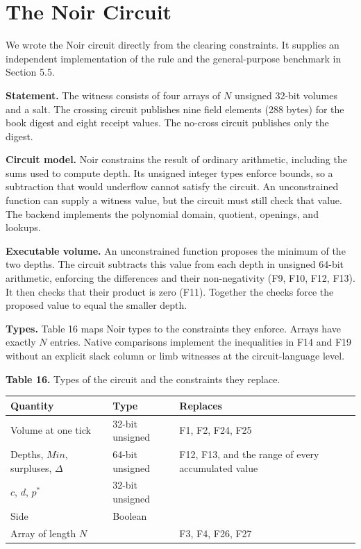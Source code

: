 
\section{The Noir Circuit}

We wrote the Noir circuit directly from the clearing constraints. It supplies an independent implementation of the rule and the general-purpose benchmark in Section 5.5.

\textbf{Statement.} The witness consists of four arrays of \(N\) unsigned 32-bit volumes and a salt. The crossing circuit publishes nine field elements (288 bytes) for the book digest and eight receipt values. The no-cross circuit publishes only the digest.

\textbf{Circuit model.} Noir constrains the result of ordinary arithmetic, including the sums used to compute depth. Its unsigned integer types enforce bounds, so a subtraction that would underflow cannot satisfy the circuit. An unconstrained function can supply a witness value, but the circuit must still check that value. The backend implements the polynomial domain, quotient, openings, and lookups.

\textbf{Executable volume.} An unconstrained function proposes the minimum of the two depths. The circuit subtracts this value from each depth in unsigned 64-bit arithmetic, enforcing the differences and their non-negativity (F9, F10, F12, F13). It then checks that their product is zero (F11). Together the checks force the proposed value to equal the smaller depth.

\textbf{Types.} Table 16 maps Noir types to the constraints they enforce. Arrays have exactly \(N\) entries. Native comparisons implement the inequalities in F14 and F19 without an explicit slack column or limb witnesses at the circuit-language level.

\textbf{Table 16.} Types of the circuit and the constraints they replace.

\begin{longtable}[]{@{}lll@{}}
\toprule\noalign{}
Quantity & Type & Replaces \\
\midrule\noalign{}
\endhead
\bottomrule\noalign{}
\endlastfoot
Volume at one tick & 32-bit unsigned & F1, F2, F24, F25 \\
Depths, \(Min\), surpluses, \(\Delta\) & 64-bit unsigned & F12, F13, and the range of every accumulated value \\
\(c\), \(d\), \(p^*\) & 32-bit unsigned & \\
Side & Boolean & \\
Array of length \(N\) & & F3, F4, F26, F27 \\
\end{longtable}

